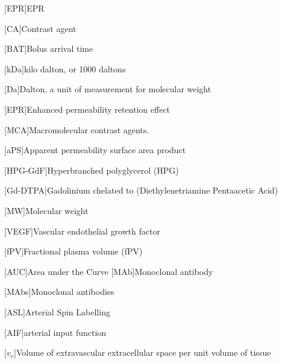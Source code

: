 \begin{acronym}
[EPR]{EPR}%

[CA]{Contrast agent}

[BAT]{Bolus arrival time}

[kDa]{kilo dalton, or 1000 daltons}

[Da]{Dalton, a unit of measurement for molecular weight}

[EPR]{Enhanced permeability retention effect}

[MCA]{Macromolecular contrast agents.}

[aPS]{Apparent permeability surface area product}%

[HPG-GdF]{Hyperbranched polyglycerol (HPG)}%

[Gd-DTPA]{Gadolinium chelated to (Diethylenetriamine Pentaacetic Acid)}%

[MW]{Molecular weight}

[VEGF]{Vascular endothelial growth factor}

[fPV]{Fractional plasma volume (fPV)}

[AUC]{Area under the Curve}%
[MAb]{Monoclonal antibody}

[MAbs]{Monoclonal antibodies}

[ASL]{Arterial Spin Labelling}

[AIF]{arterial input function}

[$v_e$]{Volume of extravascular extracellular space per unit volume of tissue}


\end{acronym}
